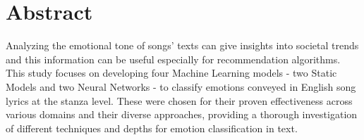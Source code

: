 \firstchapter
\chapter*{Abstract}
\label{ch:abstract}
Analyzing the emotional tone of songs' texts can give insights into societal
trends and this information can be useful especially for recommendation
algorithms.\\

This study focuses on developing four Machine Learning models - two Static Models
and two Neural Networks - to classify
emotions conveyed in English song lyrics at the stanza level.
These were chosen for their proven effectiveness across various domains and
their diverse approaches, providing a thorough investigation of different
techniques and depths for emotion classification in text.
